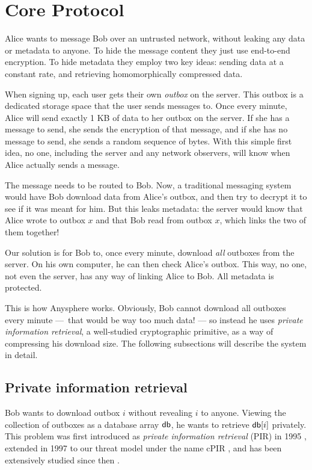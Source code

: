 \section{Core Protocol}

Alice wants to message Bob over an untrusted network, without leaking any data or metadata to anyone. To hide the message content they just use end-to-end encryption. To hide metadata they employ two key ideas: sending data at a constant rate, and retrieving homomorphically compressed data.

When signing up, each user gets their own \textit{outbox} on the server. This outbox is a dedicated storage space that the user sends messages to. Once every minute, Alice will send exactly 1 KB of data to her outbox on the server. If she has a message to send, she sends the encryption of that message, and if she has no message to send, she sends a random sequence of bytes. With this simple first idea, no one, including the server and any network observers, will know when Alice actually sends a message.

The message needs to be routed to Bob. Now, a traditional messaging system would have Bob download data from Alice's outbox, and then try to decrypt it to see if it was meant for him. But this leaks metadata: the server would know that Alice wrote to outbox $x$ and that Bob read from outbox $x$, which links the two of them together!

Our solution is for Bob to, once every minute, download \textit{all} outboxes from the server. On his own computer, he can then check Alice's outbox. This way, no one, not even the server, has any way of linking Alice to Bob. All metadata is protected.

This is how Anysphere works. Obviously, Bob cannot download all outboxes every minute — that would be way too much data! — so instead he uses \textit{private information retrieval}, a well-studied cryptographic primitive, as a way of compressing his download size. The following subsections will describe the system in detail.



\subsection{Private information retrieval}

Bob wants to download outbox $i$ without revealing $i$ to anyone. Viewing the collection of outboxes as a database array $\mathsf{db}$, he wants to retrieve $\mathsf{db}[i]$ privately. This problem was first introduced as \textit{private information retrieval} (PIR) in 1995 \cite{chor1995private}, extended in 1997 to our threat model under the name cPIR \cite{kushilevitz1997replication}, and has been extensively studied since then \cite{melchor2016xpir,angel2018pir, ahmad2021addra}.

